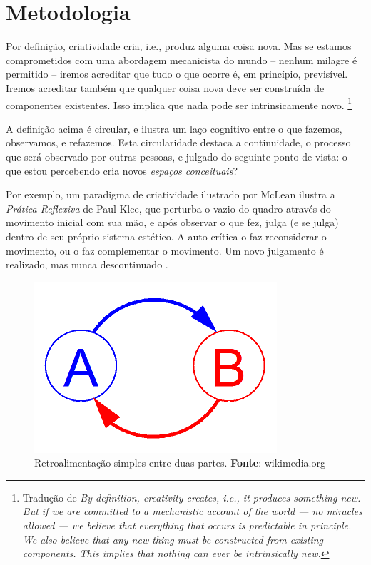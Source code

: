 \chapter{Metodologia}\label{cap:metodologia}

\begin{citacao}
Por definição, criatividade cria, i.e., produz alguma coisa nova. Mas se estamos comprometidos com uma abordagem mecanicista do mundo -- nenhum milagre é permitido -- iremos acreditar que tudo o que ocorre é, em princípio,  previsível. Iremos acreditar também que qualquer coisa nova deve ser construída de componentes existentes. Isso implica que nada pode ser intrinsicamente novo. \cite[p.~2]{thornton_quantitative_2007}\footnote{Tradução de \emph{By definition, creativity creates, i.e., it produces something new. But if we are committed to a mechanistic account of the world — no miracles allowed — we believe that everything that occurs is predictable in principle. We also believe that any new thing must be constructed from existing components. This implies that nothing can ever be intrinsically new.}}
\end{citacao}

 
A definição acima é circular, e ilustra um laço cognitivo entre o que fazemos, observamos, e refazemos. Esta circularidade destaca a continuidade, o processo que será observado por outras pessoas, e julgado do seguinte ponto de vista: o que estou percebendo cria novos \emph{espaços conceituais}? 

Por exemplo, um paradigma de criatividade ilustrado por McLean ilustra a \emph{Prática Reflexiva} de Paul Klee, que perturba o vazio do quadro através do movimento inicial com sua mão, e após observar o que fez, julga (e se julga) dentro de seu próprio sistema estético. A auto-crítica o faz reconsiderar o movimento, ou o faz complementar o movimento. Um novo julgamento é realizado, mas nunca descontinuado .

  \begin{figure}[!h]
    \centering
    \includegraphics[scale=0.5]{imagens/Simple_Feedback_02.png}
    \caption{Retroalimentação simples entre duas partes. \textbf{Fonte}: wikimedia.org}
    \label{fig:feedback}
  \end{figure}


